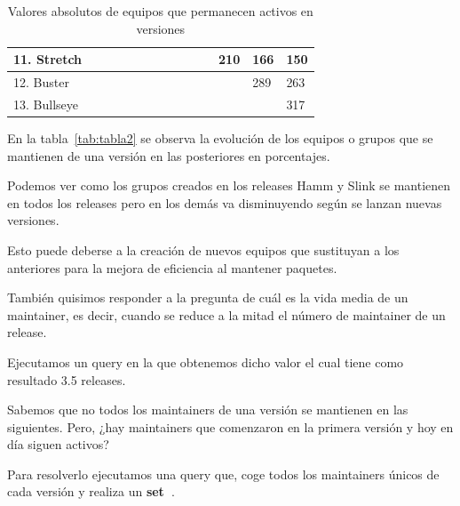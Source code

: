 \documentclass[a4paper, 12pt]{book}
\begin{document}
\begin{table}[htbp]
{\begin{tabular}{|l|l|l|l|l|l|l|l|l|l|l|l|l|l|}
			11. Stretch  & \cellcolor[HTML]{000000} & \cellcolor[HTML]{000000} & \cellcolor[HTML]{000000} & \cellcolor[HTML]{000000} & \cellcolor[HTML]{000000} & \cellcolor[HTML]{000000} & \cellcolor[HTML]{000000} & \cellcolor[HTML]{000000} & \cellcolor[HTML]{000000} & \cellcolor[HTML]{000000} & 210 & 166 & 150 \\ \hline
			12. Buster   & \cellcolor[HTML]{000000} & \cellcolor[HTML]{000000} & \cellcolor[HTML]{000000} & \cellcolor[HTML]{000000} & \cellcolor[HTML]{000000} & \cellcolor[HTML]{000000} & \cellcolor[HTML]{000000} & \cellcolor[HTML]{000000} & \cellcolor[HTML]{000000} & \cellcolor[HTML]{000000} & \cellcolor[HTML]{000000} & 289 & 263 \\ \hline
			13. Bullseye & \cellcolor[HTML]{000000} & \cellcolor[HTML]{000000} & \cellcolor[HTML]{000000} & \cellcolor[HTML]{000000} & \cellcolor[HTML]{000000} & \cellcolor[HTML]{000000} & \cellcolor[HTML]{000000} & \cellcolor[HTML]{000000} & \cellcolor[HTML]{000000} & \cellcolor[HTML]{000000} & \cellcolor[HTML]{000000} & \cellcolor[HTML]{000000} & 317 \\ \hline
	\end{tabular}}
	\caption{Valores absolutos de equipos que permanecen activos en versiones}
\end{table}





En la tabla~\ref{tab:tabla2} se observa la evolución de los equipos o grupos que se mantienen de una versión en las posteriores en porcentajes.

Podemos ver como los grupos creados en los releases Hamm y Slink se mantienen en todos los releases pero en los demás va disminuyendo según se lanzan nuevas versiones.

Esto puede deberse a la creación de nuevos equipos que sustituyan a los anteriores para la mejora de eficiencia al mantener paquetes.

También quisimos responder a la pregunta de cuál es la vida media de un maintainer, es decir, cuando se reduce a la mitad el número de maintainer de un release. 

Ejecutamos un query en la que obtenemos dicho valor el cual tiene como resultado 3.5 releases.

Sabemos que no todos los maintainers de una versión se mantienen en las siguientes. Pero, ¿hay maintainers que comenzaron en la primera versión y hoy en día siguen activos?

Para resolverlo ejecutamos una query que, coge todos los maintainers únicos de cada versión y realiza un \textbf{set~\cite{ellibrodepython:_set}}.
\end{document}
